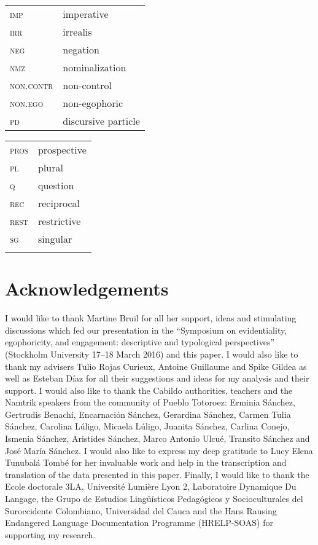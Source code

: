 \documentclass[output=paper]{langsci/langscibook}
\begin{document}
\begin{tabularx}{.45\textwidth}{lQ}
\textsc{imp} & imperative\\ 
\textsc{irr} & irrealis\\ 
\textsc{neg} & negation\\ 
\textsc{nmz} & nominalization\\ 
\textsc{non.contr} & non-control\\ 
\textsc{non.ego} & non-egophoric\\ 
\textsc{pd} & discursive particle\\ 
\end{tabularx}
\begin{tabularx}{.45\textwidth}{lQ}
\textsc{pros} & prospective\\ 
\textsc{pl} & plural\\ 
\textsc{q} & question\\ 
\textsc{rec} & reciprocal\\ 
\textsc{rest} & restrictive\\ 
\textsc{sg} & singular\\
\\
\end{tabularx}



\section*{Acknowledgements}
I would like to thank Martine Bruil for all her support, ideas and stimulating discussions which fed our presentation in the “Symposium on evidentiality, egophoricity, and engagement: descriptive and typological perspectives” (Stockholm University 17--18 March 2016) and this paper. I would also like to thank my advisers Tulio Rojas Curieux, Antoine Guillaume and Spike Gildea as well as Esteban Díaz for all their suggestions and ideas for my analysis and their support. I would also like to thank the Cabildo authorities, teachers and the Namtrik speakers from the community of Pueblo Totoroez: Erminia Sánchez, Gertrudis Benachí, Encarnación Sánchez, Gerardina Sánchez, Carmen Tulia Sánchez, Carolina Lúligo, Micaela Lúligo, Juanita Sánchez, Carlina Conejo, Ismenia Sánchez, Aristides Sánchez, Marco Antonio Ulcué, Transito Sánchez and  José María Sánchez. I would also like to express my deep gratitude to Lucy Elena Tunubalá Tombé for her invaluable work and help in the transcription and translation of the data presented in this paper. Finally, I would like to thank  the Ecole doctorale 3LA, Université Lumière Lyon 2, Laboratoire Dynamique Du Langage, the Grupo de Estudios Lingüísticos Pedagógicos y Socioculturales del Suroccidente Colombiano, Universidad del Cauca and the Hans Rausing Endangered Language Documentation Programme (HRELP-SOAS) for supporting my research.

\sloppy
\printbibliography[heading=subbibliography,notkeyword=this]
\end{document}

